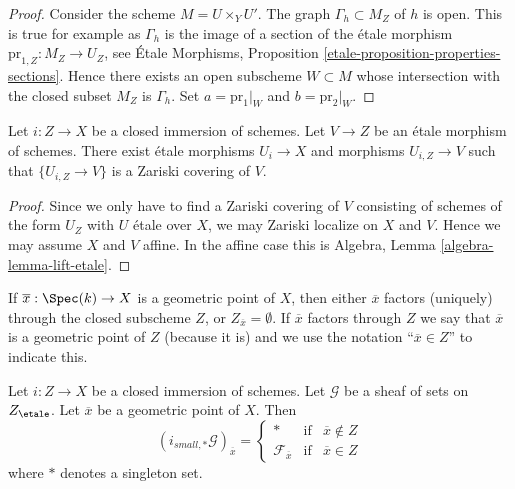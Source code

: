 \begin{proof}
Consider the scheme $M = U \times_Y U'$. The graph $\Gamma_h \subset M_Z$
of $h$ is open. This is true for example as $\Gamma_h$ is the image of a
section of the \'etale morphism $\text{pr}_{1, Z} : M_Z \to U_Z$, see
\'Etale Morphisms, Proposition \ref{etale-proposition-properties-sections}.
Hence there exists an open subscheme $W \subset M$ whose intersection with
the closed subset $M_Z$ is $\Gamma_h$. Set $a = \text{pr}_1|_W$
and $b = \text{pr}_2|_W$.
\end{proof}

\begin{lemma}
\label{lemma-closed-immersion-almost-essentially-surjective}
Let $i : Z \to X$ be a closed immersion of schemes.
Let $V \to Z$ be an \'etale morphism of schemes.
There exist \'etale morphisms $U_i \to X$ and morphisms
$U_{i, Z} \to V$ such that $\{U_{i, Z} \to V\}$
is a Zariski covering of $V$.
\end{lemma}

\begin{proof}
Since we only have to find a Zariski covering of $V$ consisting of schemes
of the form $U_Z$ with $U$ \'etale over $X$, we may Zariski localize on $X$
and $V$. Hence we may assume $X$ and $V$ affine. In the affine case this is
Algebra, Lemma \ref{algebra-lemma-lift-etale}.
\end{proof}

\noindent
If $\overline{x} : \Spec(k) \to X$ is a geometric point of $X$, then
either $\overline{x}$ factors (uniquely) through the closed subscheme $Z$, or
$Z_{\overline{x}} = \emptyset$. If $\overline{x}$ factors through $Z$
we say that $\overline{x}$ is a geometric point of $Z$ (because it is) and
we use the notation ``$\overline{x} \in Z$'' to indicate this.

\begin{lemma}
\label{lemma-stalk-pushforward-closed-immersion}
Let $i : Z \to X$ be a closed immersion of schemes.
Let $\mathcal{G}$ be a sheaf of sets on $Z_\etale$.
Let $\overline{x}$ be a geometric point of $X$.
Then
$$
(i_{small, *}\mathcal{G})_{\overline{x}} =
\left\{
\begin{matrix}
* & \text{if} & \overline{x} \not \in Z \\
\mathcal{F}_{\overline{x}} & \text{if} & \overline{x} \in Z
\end{matrix}
\right.
$$
where $*$ denotes a singleton set.
\end{lemma}

